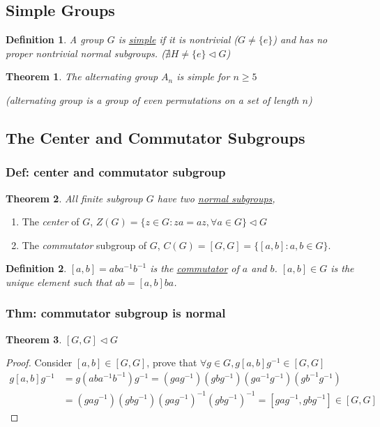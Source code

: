 \documentclass[11pt,a4paper]{article}
\newtheorem{theorem}{Theorem}
\newtheorem{definition}{Definition}
\begin{document}
\subsection{Simple Groups}
\begin{definition}
    A group $G$ is \underline{simple} if it is nontrivial ($G\neq \{e\}$) and has no proper nontrivial normal subgroups. ($\nexists H\neq \{e\} \lhd G$)
\end{definition}
\begin{theorem}
    The alternating group $A_n$ is simple for $n\geq 5$

    (alternating group is a group of even permutations on a set of length $n$)
\end{theorem}


\subsection{The Center and Commutator Subgroups}
\subsubsection{Def: center and commutator subgroup}
\begin{theorem}
All finite subgroup $G$ have two \underline{normal subgroups},
\end{theorem}
\begin{enumerate}[(1)]
    \item The \textit{center} of $G$, $Z(G)=\{z\in G: za=az,\forall a\in G\}\lhd G$
    \item The \textit{commutator} subgroup of $G$, $C(G)=[G,G]=\{[a,b]:a,b\in G\}$.
\end{enumerate}
\begin{definition}
$[a,b]=aba^{-1}b^{-1}$ is the \underline{commutator} of $a$ and $b$. $[a,b]\in G$ is the unique element such that $ab=[a,b]ba$.
\end{definition}

\subsubsection{Thm: commutator subgroup is normal}
\begin{theorem}
$[G,G]\lhd G$
\end{theorem}
\begin{proof}
Consider $[a,b]\in [G,G]$, prove that $\forall g\in G, g[a,b]g^{-1}\in [G,G]$
\begin{equation}
    \begin{aligned}
        g[a,b]g^{-1}&=g(aba^{-1}b^{-1})g^{-1}=(gag^{-1})(gbg^{-1})(ga^{-1}g^{-1})(gb^{-1}g^{-1})\\
        &=(gag^{-1})(gbg^{-1})(gag^{-1})^{-1}(gbg^{-1})^{-1}=[gag^{-1},gbg^{-1}]\in[G,G]
    \end{aligned}
    \nonumber
\end{equation}
\end{proof}
\end{document}
